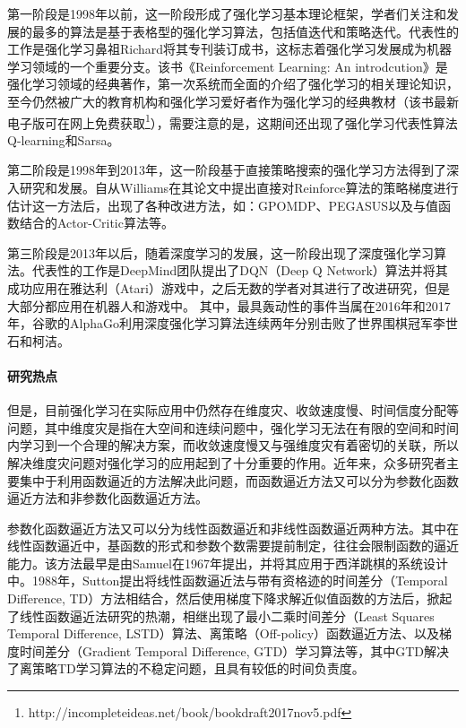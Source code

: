 第一阶段是1998年以前，这一阶段形成了强化学习基本理论框架，学者们关注和发展的最多的算法是基于表格型的强化学习算法，包括值迭代和策略迭代。代表性的工作是强化学习鼻祖Richard将其专刊装订成书，这标志着强化学习发展成为机器学习领域的一个重要分支。该书《Reinforcement Learning: An introdcution》是强化学习领域的经典著作，第一次系统而全面的介绍了强化学习的相关理论知识，至今仍然被广大的教育机构和强化学习爱好者作为强化学习的经典教材（该书最新电子版可在网上免费获取\footnote{http://incompleteideas.net/book/bookdraft2017nov5.pdf}），需要注意的是，这期间还出现了强化学习代表性算法Q-learning\citep{watkins1992q}和Sarsa\citep{rummery1994line}。

第二阶段是1998年到2013年，这一阶段基于直接策略搜索的强化学习方法得到了深入研究和发展。自从Williams在其论文\citep{williams1992simple}中提出直接对Reinforce算法的策略梯度进行估计这一方法后，出现了各种改进方法，如：GPOMDP\citep{baxter2001infinite}、PEGASUS\citep{neumann2005reinforcement}以及与值函数结合的Actor-Critic算法\citep{konda2000actor}等。

第三阶段是2013年以后，随着深度学习的发展，这一阶段出现了深度强化学习算法。代表性的工作是DeepMind团队提出了DQN（Deep Q Network）算法并将其成功应用在雅达利（Atari）游戏中\citep{mnih2013playing}，之后无数的学者对其进行了改进研究，但是
大部分都应用在机器人和游戏中。
其中，最具轰动性的事件当属在2016年和2017年，谷歌的AlphaGo利用深度强化学习算法连续两年分别击败了世界围棋冠军李世石和柯洁。

\paragraph{研究热点}
但是，目前强化学习在实际应用中仍然存在维度灾、收敛速度慢、时间信度分配等问题，其中维度灾是指在大空间和连续问题中，强化学习无法在有限的空间和时间内学习到一个合理的解决方案，而收敛速度慢又与强维度灾有着密切的关联，所以解决维度灾问题对强化学习的应用起到了十分重要的作用。近年来，众多研究者主要集中于利用函数逼近的方法解决此问题，而函数逼近方法又可以分为参数化函数逼近方法和非参数化函数逼近方法。

参数化函数逼近方法又可以分为线性函数逼近和非线性函数逼近两种方法。其中在线性函数逼近中，基函数的形式和参数个数需要提前制定，往往会限制函数的逼近能力。该方法最早是由Samuel在1967年提出，并将其应用于西洋跳棋的系统设计中\citep{samuel1959some}。1988年，Sutton提出将线性函数逼近法与带有资格迹的时间差分（Temporal Difference, TD）方法相结合，然后使用梯度下降求解近似值函数的方法后\citep{sutton1988learning}，掀起了线性函数逼近法研究的热潮，相继出现了最小二乘时间差分（Least Squares Temporal Difference, LSTD）算法\citep{bradtke1996linear}、离策略（Off-policy）函数逼近方法\citep{precup2001off}、以及梯度时间差分（Gradient Temporal Difference, GTD）学习算法\citep{sutton2009convergent}等，其中GTD解决了离策略TD学习算法的不稳定问题，且具有较低的时间负责度\citep{sutton2009convergent}。

